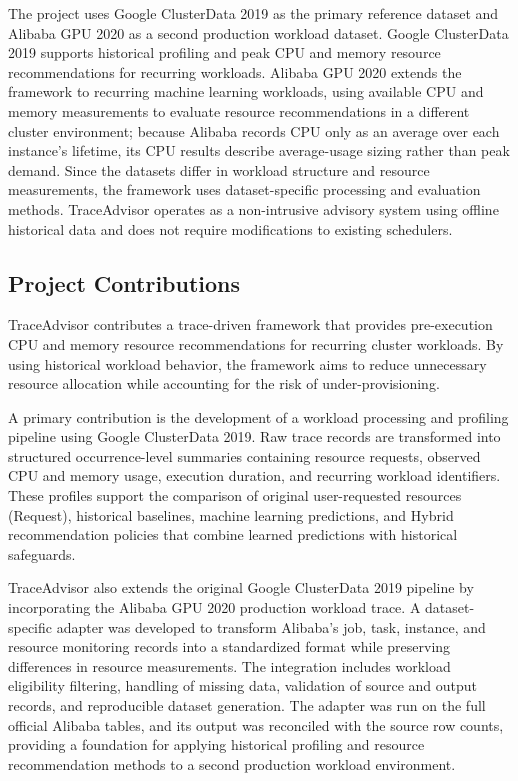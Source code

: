 The project uses Google ClusterData 2019 as the primary reference dataset and Alibaba GPU 2020 as a second production workload dataset. Google ClusterData 2019 supports historical profiling and peak CPU and memory resource recommendations for recurring workloads. Alibaba GPU 2020 extends the framework to recurring machine learning workloads, using available CPU and memory measurements to evaluate resource recommendations in a different cluster environment; because Alibaba records CPU only as an average over each instance's lifetime, its CPU results describe average-usage sizing rather than peak demand. Since the datasets differ in workload structure and resource measurements, the framework uses dataset-specific processing and evaluation methods. TraceAdvisor operates as a non-intrusive advisory system using offline historical data and does not require modifications to existing schedulers.

\subsection{Project Contributions}\label{sec:1.5}

TraceAdvisor contributes a trace-driven framework that provides pre-execution CPU and memory resource recommendations for recurring cluster workloads. By using historical workload behavior, the framework aims to reduce unnecessary resource allocation while accounting for the risk of under-provisioning.

A primary contribution is the development of a workload processing and profiling pipeline using Google ClusterData 2019. Raw trace records are transformed into structured occurrence-level summaries containing resource requests, observed CPU and memory usage, execution duration, and recurring workload identifiers. These profiles support the comparison of original user-requested resources (Request), historical baselines, machine learning predictions, and Hybrid recommendation policies that combine learned predictions with historical safeguards.

TraceAdvisor also extends the original Google ClusterData 2019 pipeline by incorporating the Alibaba GPU 2020 production workload trace. A dataset-specific adapter was developed to transform Alibaba's job, task, instance, and resource monitoring records into a standardized format while preserving differences in resource measurements. The integration includes workload eligibility filtering, handling of missing data, validation of source and output records, and reproducible dataset generation. The adapter was run on the full official Alibaba tables, and its output was reconciled with the source row counts, providing a foundation for applying historical profiling and resource recommendation methods to a second production workload environment.

